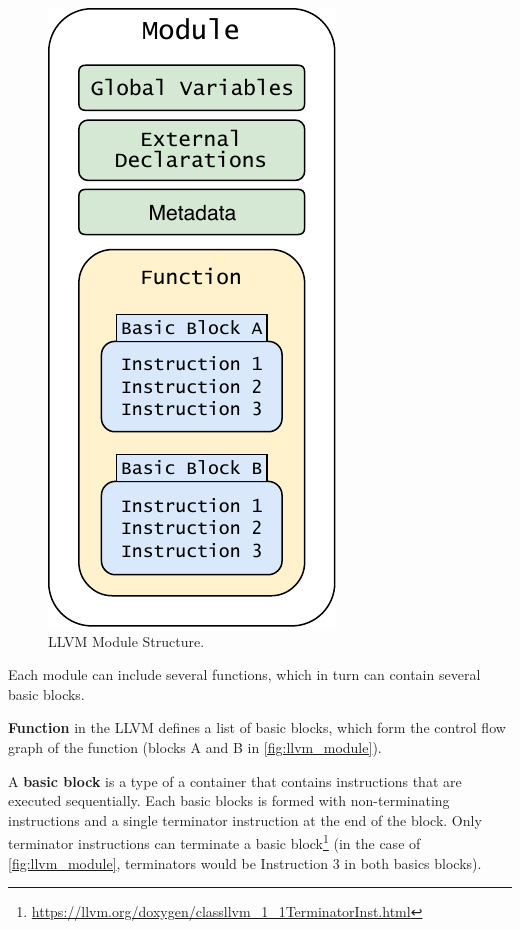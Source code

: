 \documentclass[12pt, twoside]{fithesis2}
\renewcommand{\_}{\leavevmode \kern0.07em\vbox{\hrule width0.4em}}
\begin{document}
\begin{figure}[ht]
    \centering
    \includegraphics[]{images/llvm/llvm_module.pdf}
    \caption{LLVM Module Structure.}
    \label{fig:llvm_module}
\end{figure}

Each module can include several functions, which in turn can contain several
basic blocks.

\textbf{Function} in the LLVM defines a list of basic blocks, which form the
control flow graph of the function (blocks A and B in \autoref{fig:llvm_module}).
\cite{llvm-ir}

A \textbf{basic block} is a type of a container that contains instructions that
are executed sequentially\cite{llvm-bb}. Each basic blocks is formed with
non-terminating instructions and a single terminator instruction at the end of
the block. Only terminator instructions can terminate a basic block\footnote{
\url{https://llvm.org/doxygen/classllvm_1_1TerminatorInst.html}
}
(in the case of \autoref{fig:llvm_module}, terminators would be Instruction 3
in both basics blocks).
\end{document}
